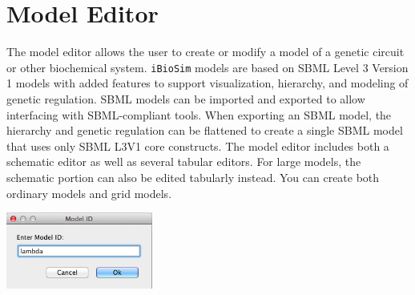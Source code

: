 \documentclass[titlepage,11pt]{article}
\begin{document}

\clearpage

\section{\label{ModelEdit}Model Editor}

\noindent
The model editor allows the user to create or modify a model of a genetic circuit or other biochemical system.  {\tt iBioSim} models are based on SBML Level 3 Version 1 models with added features to support visualization, hierarchy, and modeling of genetic regulation.  SBML models can be imported and exported to allow interfacing with SBML-compliant tools.  When exporting an SBML model, the hierarchy and genetic regulation can be flattened to create a single SBML model that uses only SBML L3V1 core constructs.  The model editor includes both a schematic editor as well as several tabular editors.  For large models, the schematic portion can also be edited tabularly instead.  You can create both ordinary models and grid models.

\begin{center}
\includegraphics[height=25mm]{screenshots/ModelId}
\end{center}
\end{document}
